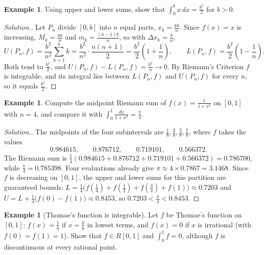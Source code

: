 \documentclass[11pt,a4paper]{article}
\numberwithin{equation}{section}
\theoremstyle{definition}
\newtheorem{exa}[thm]{Example}
\newenvironment{solution}
  {\renewcommand{\qedsymbol}{}\begin{proof}[\textit{Solution}.]}
  {\end{proof}}
\begin{document}
\begin{exa}
Using upper and lower sums, show that $\int_0^b x\,dx = \frac{b^2}{2}$ for $b>0$.
\end{exa}

\begin{solution}
Let $P_n$ divide $[0,b]$ into $n$ equal parts, $x_k = \frac{kb}{n}$. Since $f(x) = x$ is increasing, $M_k = \frac{kb}{n}$ and $m_k = \frac{(k-1)b}{n}$, so with $\Delta x_k = \frac{b}{n}$,
$$U(P_n,f) = \frac{b^2}{n^2}\sum_{k=1}^nk = \frac{b^2}{n^2}\cdot\frac{n(n+1)}{2} = \frac{b^2}{2}\left(1+\frac{1}{n}\right),\qquad L(P_n,f) = \frac{b^2}{2}\left(1-\frac{1}{n}\right).$$
Both tend to $\frac{b^2}{2}$, and $U(P_n,f) - L(P_n,f) = \frac{b^2}{n}\longrightarrow 0$. By Riemann's Criterion $f$ is integrable, and its integral lies between $L(P_n,f)$ and $U(P_n,f)$ for every $n$, so it equals $\frac{b^2}{2}$.
\end{solution}

\begin{exa}
Compute the midpoint Riemann sum of $f(x) = \frac{1}{1+x^2}$ on $[0,1]$ with $n = 4$, and compare it with $\int_0^1\frac{dx}{1+x^2} = \frac{\pi}{4}$.
\end{exa}

\begin{solution}
The midpoints of the four subintervals are $\frac{1}{8}, \frac{3}{8}, \frac{5}{8}, \frac{7}{8}$, where $f$ takes the values
$$0.984615,\qquad 0.876712,\qquad 0.719101,\qquad 0.566372 .$$
The Riemann sum is $\frac{1}{4}(0.984615 + 0.876712 + 0.719101 + 0.566372) = 0.786700$, while $\frac{\pi}{4} = 0.785398$. Four evaluations already give $\pi\approx 4\times0.7867 = 3.1468$. Since $f$ is decreasing on $[0,1]$, the upper and lower sums for this partition are guaranteed bounds: $L = \frac{1}{4}\bigl(f(\frac14)+f(\frac12)+f(\frac34)+f(1)\bigr)\approx 0.7203$ and $U = L + \frac{1}{4}\bigl(f(0) - f(1)\bigr)\approx 0.8453$, so $0.7203<\frac{\pi}{4}<0.8453$.
\end{solution}

\begin{exa}[Thomae's function is integrable]
Let $f$ be Thomae's function on $[0,1]$: $f(x) = \frac{1}{q}$ if $x = \frac{p}{q}$ in lowest terms, and $f(x) = 0$ if $x$ is irrational (with $f(0) = f(1) = 1$). Show that $f\in R[0,1]$ and $\int_0^1f = 0$, although $f$ is discontinuous at every rational point.
\end{exa}
\end{document}
